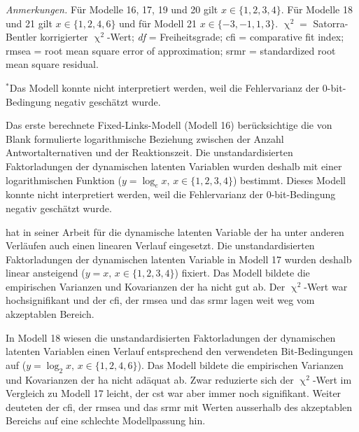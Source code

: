 \documentclass[11pt, twoside, a4paper]{book}		%
\begin{document}
\begin{table}[htbp]
\begin{adjustbox}{width=1\textwidth, keepaspectratio}
\begin{threeparttable}
{\begin{tabular}
					
				\end{tabular}%
			}
			\begin{tablenotes}[flushleft]
				\footnotesize				%
				\setlength{}	%
				\item \textit{Anmerkungen.} Für Modelle 16, 17, 19 und 20 gilt $x\in\{1,2,3,4\}$. Für Modelle 18 und 21 gilt $x\in\{1,2,4,6\}$ und für Modell 21 $x\in\{-3,-1,1,3\}$. $\upchi^2 =$ Satorra-Bentler \citeyearpar{Satorra1994} korrigierter $\upchi^2$-Wert; \textit{df} = Freiheitsgrade; \gls{cfi} = comparative fit index; \gls{rmsea} = root mean square error of approximation; \gls{srmr} = standardized root mean square residual.
				\item {$^{*}$}Das Modell konnte nicht interpretiert werden, weil die Fehlervarianz der 0-bit-Bedingung negativ geschätzt wurde.
				
			\end{tablenotes}%
		\end{threeparttable}
	\end{adjustbox}	
\end{table}



Das erste berechnete Fixed-Links-Modell (Modell 16) berücksichtige die von Blank \citep[1934; zitiert nach][S. 103]{Jensen1987a} formulierte logarithmische Beziehung zwischen der Anzahl Antwortalternativen und der Reaktionszeit. Die unstandardisierten Faktorladungen der dynamischen latenten Variablen wurden deshalb mit einer logarithmischen Funktion ($y=\log_{e}x,\,x\in\{1, 2, 3, 4\}$) bestimmt. Dieses Modell konnte nicht interpretiert werden, weil die Fehlervarianz der 0-bit-Bedingung negativ geschätzt wurde.

\citet{Schweizer2006a} hat in seiner Arbeit für die dynamische latenten Variable der \gls{ha} unter anderen Verläufen auch einen linearen Verlauf eingesetzt. 
Die unstandardisierten Faktorladungen der dynamischen latenten Variable in Modell 17 wurden deshalb linear ansteigend ($y=x,\,x\in\{1, 2, 3, 4\}$) fixiert. Das Modell bildete die empirischen Varianzen und Kovarianzen der \gls{ha} nicht gut ab. Der $\upchi^2$-Wert war hochsignifikant und der \gls{cfi}, der \gls{rmsea} und das \gls{srmr} lagen weit weg vom akzeptablen Bereich.

In Modell 18 wiesen die unstandardisierten Faktorladungen der dynamischen latenten Variablen einen Verlauf entsprechend den verwendeten Bit-Bedingungen auf ($y=\log_{2}x,\,x\in\{1, 2, 4, 6\}$). Das Modell bildete die empirischen Varianzen und Kovarianzen der \gls{ha} nicht adäquat ab. Zwar reduzierte sich der $\upchi^2$-Wert im Vergleich zu Modell 17 leicht, der \gls{cst} war aber immer noch signifikant. Weiter deuteten der \gls{cfi}, der \gls{rmsea} und das \gls{srmr} mit Werten ausserhalb des akzeptablen Bereichs auf eine schlechte Modellpassung hin.
\end{document}

